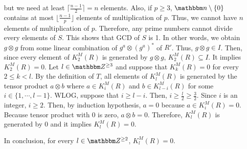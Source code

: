 but we need at least \(\lceil\frac{n - 1}{2}\rceil = n\) elements.
Also, if \(p \ge 3\), \(\bbn \setminus \{0\}\) contains at most
\(\lfloor\frac{n - 1}{p}\rfloor\) elements of multiplication of \(p\).
Thus, we cannot have \(n\) elements of multiplication of \(p\).
Therefore, any prime numbers cannot divide every elements of \(S\).
This shows that GCD of \(S\) is 1.
In other words, we obtain \(g \otimes g\) from
some linear combination of \(g^a \otimes (g^a)^*\) of \(R'\).
Thus, \(g \otimes g \in I\).
\br
\noindent
Then, since every element of \(K_2^M(R)\) is generated by \(g \otimes g\),
\(K_2^M(R) \subseteq I\).
It implies
\(K_2^M(R) = 0\).
\br
\noindent
Let \(l \in \bbZ^{\ge 3}\) and suppose that
\(K_k^M(R)= 0\)  for every \(2 \le k < l\).
By the definition of \(T\),
all elements of \(K_l^M(R)\) is generated by the tensor product
\(a \otimes b\)
where \(a \in K_i^M(R)\) and \(b \in K_{l - i}^M(R)\)
for some \(i \in \{1, \cdots, l - 1\}\).
WLOG, suppose that \(i \ge l - i\).
Then, \(i \ge \frac{l}{2} \ge \frac{3}{2}\).
Since \(i\) is an integer, \(i \ge 2\).
Then, by induction hypothesis,
\(a = 0\) because \(a \in K_i^M(R) = 0\).
Because tensor product with \(0\) is zero, \(a \otimes b = 0\).
Therefore, \(K_l^M(R)\) is generated by \(0\)
and it implies \(K_l^M(R) = 0\).

In conclusion, for every \(l \in \bbZ^{\ge 2}\), \(K_l^M(R) = 0\).
\qedsq